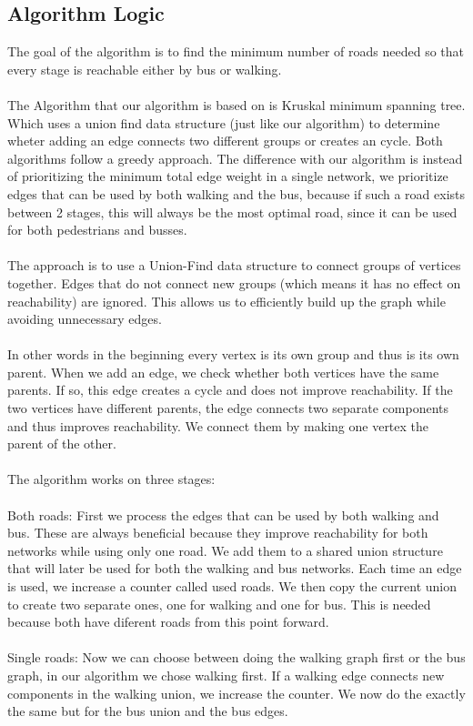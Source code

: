 \documentclass[a4paper]{article}
\begin{document}
\subsection{Algorithm Logic}
The goal of the algorithm is to find the minimum number of roads needed so that every stage is reachable either by bus or walking.
\\
\\
The Algorithm that our algorithm is based on is Kruskal minimum spanning tree. Which uses a union find data structure (just like our algorithm) to determine wheter adding an edge connects two different groups or creates an cycle. Both algorithms follow a greedy approach. The difference with our algorithm is instead of prioritizing the minimum total edge weight in a single network, we prioritize edges that can be used by both walking and the bus, because if such a road exists between 2 stages, this will always be the most optimal road, since it can be used for both pedestrians and busses.
\\
\\
The approach is to use a Union-Find data structure to connect groups of vertices together.
Edges that do not connect new groups (which means it has no effect on reachability) are ignored.
This allows us to efficiently build up the graph while avoiding unnecessary edges.
\\
\\
In other words in the beginning every vertex is its own group and thus is its own parent.
When we add an edge, we check whether both vertices have the same parents. If so, this edge creates a cycle and does not improve reachability.
If the two vertices have different parents, the edge connects two separate components and thus improves reachability. We connect them by making one vertex the parent of the other.
\\
\\
The algorithm works on three stages:
\\
\\
Both roads:
First we process the edges that can be used by both walking and bus.
These are always beneficial because they improve reachability for both networks while using only one road.
We add them to a shared union structure that will later be used for both the walking and bus networks.
Each time an edge is used, we increase a counter called used roads.
We then copy the current union to create two separate ones, one for walking and one for bus.
This is needed because both have diferent roads from this point forward.
\\
\\
Single roads:
Now we can choose between doing the walking graph first or the bus graph, in our algorithm we chose walking first.
If a walking edge connects new components in the walking union, we increase the counter.
We now do the exactly the same but for the bus union and the bus edges.
\end{document}
